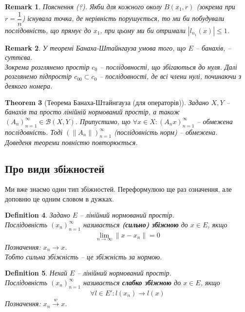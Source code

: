 \documentclass[a4paper, 10pt]{article}
\theoremstyle{theoremdd}
\newtheorem{theorem}{Theorem}[subsection]
\theoremstyle{theoremdd}
\newtheorem{definition}[theorem]{Definition}
\theoremstyle{theoremdd}
\theoremstyle{theoremdd}
\theoremstyle{theoremdd}
\theoremstyle{theoremdd}
\newtheorem{remark}[theorem]{Remark}
\theoremstyle{theoremdd}
\theoremstyle{theoremdd}
\newcommand{\toweak}{\overset{w}{\to}}
\begin{document}
\begin{remark}
Пояснення (?). Якби для кожного околу $B(x_1,r)$ (зокрема при $r = \dfrac{1}{n}$) існувала точка, де нерівність порушується, то ми би побудували послідовність, що прямує до $x_1$, при цьому ми би отримали $|l_{n_1}(x)| \leq 1$.
\end{remark}

\begin{remark}
У теоремі Банаха-Штайнгауза умова того, що $E$ -- банахів, -- суттєва.\\
Зокрема розглянемо простір $c_0$ -- послідовності, що збігаються до нуля. Далі розглянемо підпростір $c_{00} \subset c_0$ -- послідовності, де всі члени нулі, починаючи з деякого номера.
\end{remark}

\begin{theorem}[Теорема Банаха-Штайнгауза (для операторів)]
Задано $X,Y$ -- банахів та просто лінійній нормований простір, а також $(A_n)_{n=1}^\infty \in \mathcal{B}(X,Y)$. Припустимо, що $\forall x \in X: (A_n x)_{n=1}^\infty$ -- обмежена послідовність. Тоді $(\|A_n\|)_{n=1}^\infty$ (послідовність норм) -- обмежена.\\
\textit{Доведеня теореми повністю повторюється.}
\end{theorem}

\subsection{Про види збіжностей}
Ми вже знаємо один тип збіжностей. Переформулюю ще раз означення, але доповню це одним словом в дужках.
\begin{definition}
Задано $E$ -- лінійний нормований простір.\\
Послідовність $(x_n)_{n=1}^\infty$ називається \textbf{(сильно) збіжною} до $x \in E$, якщо
\begin{align*}
\lim_{n \to \infty} \|x - x_n\| = 0
\end{align*}
Позначення: $x_n \to x$.\\
Тобто сильна збіжність -- це збіжність за нормою.
\end{definition}

\begin{definition}
Нехай $E$ -- лінійний нормований простір.\\
Послідовність $(x_n)_{n=1}^\infty$ називається \textbf{слабко збіжною} до $x \in E$, якщо
\begin{align*}
\forall l \in E': l(x_n) \to l(x)
\end{align*}
Позначення: $x_n \toweak x$.
\end{definition}
\noindent
\end{document}
